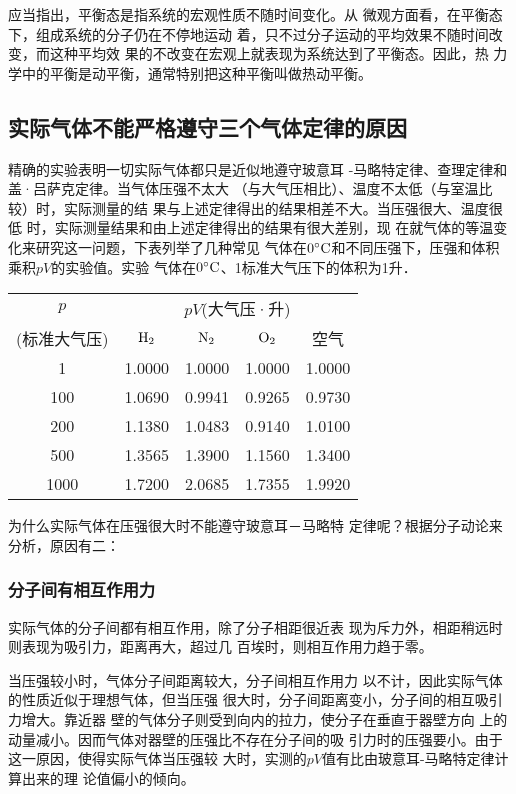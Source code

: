 应当指出，平衡态是指系统的宏观性质不随时间变化。从
微观方面看，在平衡态下，组成系统的分子仍在不停地运动
着，只不过分子运动的平均效果不随时间改变，而这种平均效
果的不改变在宏观上就表现为系统达到了平衡态。因此，热
力学中的平衡是动平衡，通常特别把这种平衡叫做热动平衡。

\subsection{实际气体不能严格遵守三个气体定律的原因}
精确的实验表明一切实际气体都只是近似地遵守玻意耳
-马略特定律、查理定律和盖·吕萨克定律。当气体压强不太大
（与大气压相比）、温度不太低（与室温比较）时，实际测量的结
果与上述定律得出的结果相差不大。当压强很大、温度很低
时，实际测量结果和由上述定律得出的结果有很大差别，现
在就气体的等温变化来研究这一问题，下表列举了几种常见
气体在$0^{\circ}{\rm C}$和不同压强下，压强和体积乘积$pV$的实验值。实验
气体在$0^{\circ}{\rm C}$、1标准大气压下的体积为1升．

\begin{center}
\begin{tabular}{c|cccc}
    \hline
    $p$ & \multicolumn{4}{|c}{$pV$(大气压·升)}\\
    \cline{2-5}
(标准大气压)&  ${\rm H}_2$&  ${\rm N}_2$&  ${\rm O}_2$&  空气\\
\hline
1&1.0000&1.0000&1.0000&1.0000\\
100&1.0690&0.9941&0.9265&0.9730\\
200&1.1380&1.0483&0.9140&1.0100\\
500&1.3565&1.3900&1.1560&1.3400\\
1000&1.7200&2.0685&1.7355&1.9920\\
\hline
\end{tabular}
\end{center}

为什么实际气体在压强很大时不能遵守玻意耳－马略特
定律呢？根据分子动论来分析，原因有二：

\subsubsection{分子间有相互作用力}
实际气体的分子间都有相互作用，除了分子相距很近表
现为斥力外，相距稍远时则表现为吸引力，距离再大，超过几
百埃时，则相互作用力趋于零。

当压强较小时，气体分子间距离较大，分子间相互作用力
以不计，因此实际气体的性质近似于理想气体，但当压强
很大时，分子间距离变小，分子间的相互吸引力增大。靠近器
壁的气体分子则受到向内的拉力，使分子在垂直于器壁方向
上的动量减小。因而气体对器壁的压强比不存在分子间的吸
引力时的压强要小。由于这一原因，使得实际气体当压强较
大时，实测的$pV$值有比由玻意耳-马略特定律计算出来的理
论值偏小的倾向。


